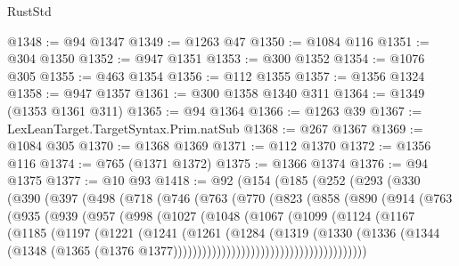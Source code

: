 \begin{lexlean}{RustStd}
\begin{coremodule}
@1348 := @94 @1347
@1349 := @1263 @47
@1350 := @1084 @116
@1351 := @304 @1350
@1352 := @947 @1351
@1353 := @300 @1352
@1354 := @1076 @305
@1355 := @463 @1354
@1356 := @112 @1355
@1357 := @1356 @1324
@1358 := @947 @1357
@1361 := @300 @1358 @1340 @311
@1364 := @1349 (@1353 @1361 @311)
@1365 := @94 @1364
@1366 := @1263 @39
@1367 := LexLeanTarget.TargetSyntax.Prim.natSub
@1368 := @267 @1367
@1369 := @1084 @305
@1370 := @1368 @1369
@1371 := @112 @1370
@1372 := @1356 @116
@1374 := @765 (@1371 @1372)
@1375 := @1366 @1374
@1376 := @94 @1375
@1377 := @10 @93
@1418 := @92
    (@154
      (@185
        (@252
          (@293
            (@330
              (@390
                (@397
                  (@498
                    (@718
                      (@746
                        (@763
                          (@770
                            (@823
                              (@858
                                (@890
                                  (@914
                                    (@763
                                      (@935
                                        (@939
                                          (@957
                                            (@998
                                              (@1027
                                                (@1048
                                                  (@1067
                                                    (@1099
                                                      (@1124
                                                        (@1167
                                                          (@1185
                                                            (@1197
                                                              (@1221
                                                                (@1241
                                                                  (@1261
                                                                    (@1284
                                                                      (@1319
                                                                        (@1330
                                                                          (@1336
                                                                            (@1344
                                                                              (@1348
                                                                                (@1365
                                                                                  (@1376
                                                                                    @1377))))))))))))))))))))))))))))))))))))))))

\end{coremodule}
\end{lexlean}
